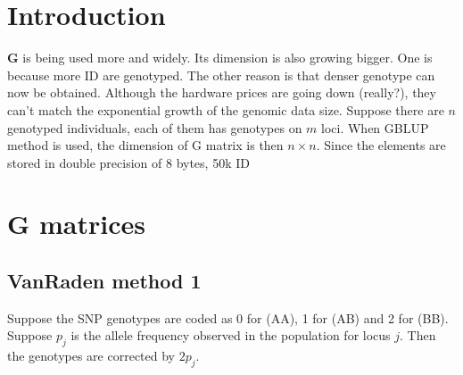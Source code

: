 \documentclass[a4]{article}
\begin{document}
\section{Introduction}
$\mathbf{G}$ is being used more and widely.
Its dimension is also growing bigger.
One is because more ID are genotyped.
The other reason is that denser genotype can now be obtained.
Although the hardware prices are going down (really?),
they can't match the exponential growth of the genomic data size.
Suppose there are $n$ genotyped individuals,
each of them has genotypes on $m$ loci.
When GBLUP method is used,
the dimension of G matrix is then $n\times n$.
Since the elements are stored in double precision of 8 bytes,
50k ID

\section{G matrices}
\subsection{VanRaden method 1}
Suppose the SNP genotypes are coded as 0 for (AA), 1 for (AB) and 2 for (BB).
Suppose $p_j$ is the allele frequency observed in the population for locus $j$.
Then the genotypes are corrected by $2p_j$.
\end{document}
